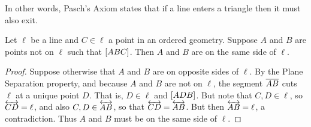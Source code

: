 In other words, Pasch's Axiom states that if a line enters a triangle then it must also exit.

\begin{lem}
Let $\ell$ be a line and $C \in \ell$ a point in an ordered geometry. Suppose $A$ and $B$ are points not on $\ell$ such that $[ A B C ]$. Then $A$ and $B$ are on the same side of $\ell$.
\end{lem}

\begin{proof}
Suppose otherwise that $A$ and $B$ are on opposite sides of $\ell$. By the Plane Separation property, and because $A$ and $B$ are not on $\ell$, the segment $\overline{AB}$ cuts $\ell$ at a unique point $D$. That is, $D \in \ell$ and $[ A D B ]$. But note that $C, D \in \ell$, so $\overleftrightarrow{CD} = \ell$, and also $C, D \in \overleftrightarrow{AB}$, so that $\overleftrightarrow{CD} = \overleftrightarrow{AB}$. But then $\overleftrightarrow{AB} = \ell$, a contradiction. Thus $A$ and $B$ must be on the same side of $\ell$.
\end{proof}

\Exercises%
